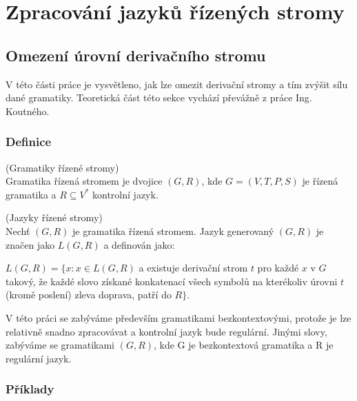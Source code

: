\chapter{Zpracování jazyků řízených stromy}

\section{Omezení úrovní derivačního stromu}

V této části práce je vysvětleno, jak lze omezit derivační stromy a tím zvýšit
sílu dané gramatiky.
Teoretická část této sekce vychází převážně z práce Ing. Koutného\cite{Koutny}.\\

\subsection{Definice}

\begin{defn}
  (Gramatiky řízené stromy) \cite[str. 28]{Koutny}\\
  Gramatika řízená stromem je dvojice $(G, R)$, kde $G = (V, T, P, S)$
  je řízená gramatika a $R \subseteq V^*$ kontrolní jazyk.
\end{defn}

\begin{defn}
  (Jazyky řízené stromy) \cite[str. 28]{Koutny} \label{jazykyRS}\\
  Nechť $(G, R)$ je gramatika řízená stromem.
  Jazyk generovaný $(G, R)$ je značen jako $L(G, R)$ a definován jako:
  \begin{adjustwidth}{0.5cm}{0.5cm}
    $L(G, R) = \{x: x \in L(G, R)$ a existuje derivační strom $t$ pro
    každé $x$ v $G$ takový, že každé slovo získané konkatenací
    všech symbolů na kterékoliv úrovni $t$ (kromě poslení) zleva doprava,
    patří do $R \}$.\\
  \end{adjustwidth}
\end{defn}

\noindent
V této práci se zabýváme především gramatikami bezkontextovými, protože
je lze relativně snadno zpracovávat a kontrolní jazyk bude regulární.
Jinými slovy, zabýváme se gramatikami $(G, R)$, kde G je bezkontextová gramatika
a R je regulární jazyk.

\subsection{Příklady}

